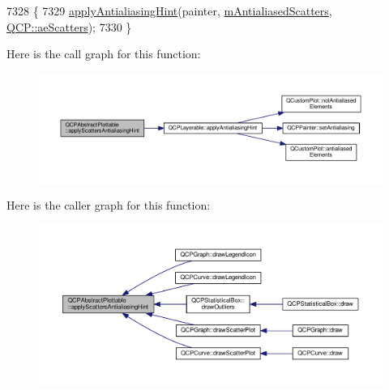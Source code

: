 \begin{DoxyCode}
7328 \{
7329   \hyperlink{class_q_c_p_layerable_a62bd552d1a45aa9accb24b310542279e}{applyAntialiasingHint}(painter, \hyperlink{class_q_c_p_abstract_plottable_aa115755e525a8e3a86dc683f9cab755b}{mAntialiasedScatters}, 
      \hyperlink{namespace_q_c_p_ae55dbe315d41fe80f29ba88100843a0cae45ed8cd167bffe27d7f40da4bc17e9c}{QCP::aeScatters});
7330 \}
\end{DoxyCode}


Here is the call graph for this function\+:\nopagebreak
\begin{figure}[H]
\begin{center}
\leavevmode
\includegraphics[width=350pt]{class_q_c_p_abstract_plottable_a753272ee225a62827e90c3e1e78de4b1_cgraph}
\end{center}
\end{figure}




Here is the caller graph for this function\+:\nopagebreak
\begin{figure}[H]
\begin{center}
\leavevmode
\includegraphics[width=350pt]{class_q_c_p_abstract_plottable_a753272ee225a62827e90c3e1e78de4b1_icgraph}
\end{center}
\end{figure}


\hypertarget{class_q_c_p_abstract_plottable_aa74cdceb9c7286ef116fbfa58e0326e7}{}
